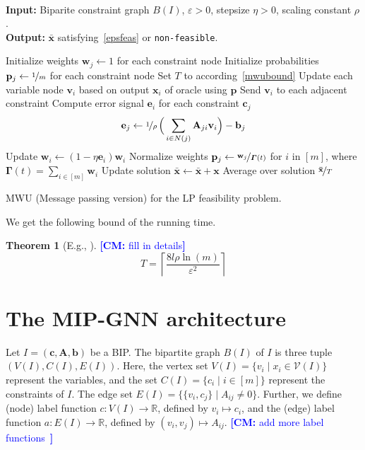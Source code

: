 \documentclass[11pt, DIV=12]{scrartcl}
\theoremstyle{definition}
\newtheorem{theorem}{Theorem}
\newcommand{\cV}{\ensuremath{{\mathcal V}}\xspace}
\newcommand{\bbR}{\ensuremath{\mathbb{R}}}
\renewcommand{\vec}[1]{\mathbf{#1}}
\newcommand{\cm}[1]{{{\textcolor{blue}{\textbf{[CM:} {#1}\textbf{]}}}}}
\begin{document}
\begin{algorithm}[H]\mbox{\hfill}
	\\\textbf{Input:} Biparite constraint graph $B(I)$, $\varepsilon > 0$,  stepsize $\eta > 0$, scaling constant $\rho$. \\
	\textbf{Output:} $\vec{\bar{x}}$ satisfying~\cref{epsfeas} or \texttt{non-feasible}.
	\begin{algorithmic}[1]
		\State Initialize weights $\vec{w}_j \leftarrow 1$ for each constraint node
		\State Initialize probabilities $\vec{p}_j \leftarrow \nicefrac{1}{m}$ for each constraint node
		\State Set $T$ to according~\cref{mwubound}
		\State Update each variable node $\vec{v}_i$ based on output $\vec{x}_i$ of oracle using $\vec{p}$
		\State Send $\vec{v}_i$ to each adjacent constraint
		\State Compute error signal $\vec{e}_i$ for each constraint $\vec{c}_j$
		\begin{equation*}
		\vec{e}_j \leftarrow \nicefrac{1}{\rho}\,\Big(\sum_{i \in N(j)} \label{key}\vec{A}_{ji}  \vec{v}_i \Big) - \vec{b}_j   
		\end{equation*}
		\State Update $\vec{w}_i \leftarrow (1 - \eta \vec{e}_i) \vec{w}_i$ 
		\State Normalize weights $\vec{p}_j \leftarrow \nicefrac{\vec{w}_j}{\boldsymbol{\Gamma}(t)} $  for $i$ in $[m]$, where $\boldsymbol{\Gamma}(t) = \sum_{i \in [m]} \vec{w}_i$
		\State Update solution $\vec{\bar{x}} \leftarrow \vec{\bar{x}} + \vec{x}$
		\EndFor
		\State \Return Average over solution $ \nicefrac{\vec{\bar{x}}}{T}$
	\end{algorithmic}
	\caption{MWU (Message passing version) for the LP feasibility problem.}
	\label{alg:as}
\end{algorithm}

We get the following bound of the running time.
\begin{theorem}[E.g., \cite{Aro+2012}]
	\cm{fill in details}
	\begin{equation}\label{mwubound}
		T = \left\lceil \frac{8 l \rho \ln(m)}{\varepsilon^2} \right\rceil 
	\end{equation}
\end{theorem}

\section{The MIP-GNN architecture}


Let $I = (\vec{c}, \vec{A}, \vec{b})$ be a BIP. The bipartite graph $B(I)$ of $I$ is three tuple $(V(I),C(I),E(I))$. Here, the vertex set $V(I) = \{ v_i \mid x_i \in \cV(I) \}$ represent the variables, and the set $C(I) = \{ c_i \mid i \in [m]  \}$ represent the constraints of $I$. The edge set $E(I) = \{ \{ v_i,c_j \} \mid A_{ij} \neq 0 \}$. Further, we define (node) label function $c\colon V(I) \to \bbR$, defined by $v_i \mapsto c_i$, and the (edge) label function $a \colon E(I) \to \bbR$, defined by  $(v_i,v_j) \mapsto A_{ij}$.
\cm{add more label functions }
\end{document}

